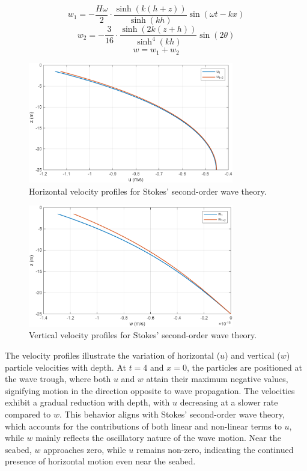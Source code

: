 \documentclass[a4paper]{article}
\begin{document}
\[w_1 = -\frac{H \omega}{2} \cdot \frac{\sinh(k(h+z))}{\sinh(kh)} \sin(\omega t - kx)\]
\[w_2 = -\frac{3}{16} \cdot \frac{\sinh(2k(z+h))}{\sinh^4(kh)} \sin(2\theta)\]
\[w = w_1 + w_2\]

\begin{figure}[H]
    \centering
    \includegraphics[width=0.8\textwidth]{CE591HW1-Q1b.png}
    \caption{\small Horizontal velocity profiles for Stokes' second-order wave theory.}
    \label{fig:plot2b}
\end{figure}


\begin{figure}[H]
    \centering
    \includegraphics[width=0.8\textwidth]{CE591HW1-Q1b_2.png}
    \caption{\small Vertical velocity profiles for Stokes' second-order wave theory.}
    \label{fig:plot2.2b}
\end{figure}
\vspace{0.3cm}

The velocity profiles illustrate the variation of horizontal (\(u\)) and vertical (\(w\)) particle velocities with depth. At \(t = 4\) and \(x = 0\), the particles are positioned at the wave trough, where both \(u\) and \(w\) attain their maximum negative values, signifying motion in the direction opposite to wave propagation. The velocities exhibit a gradual reduction with depth, with \(u\) decreasing at a slower rate compared to \(w\). This behavior aligns with Stokes' second-order wave theory, which accounts for the contributions of both linear and non-linear terms to \(u\), while \(w\) mainly reflects the oscillatory nature of the wave motion. Near the seabed, \(w\) approaches zero, while \(u\) remains non-zero, indicating the continued presence of horizontal motion even near the seabed.
\vspace{0.3cm}
\end{document}
